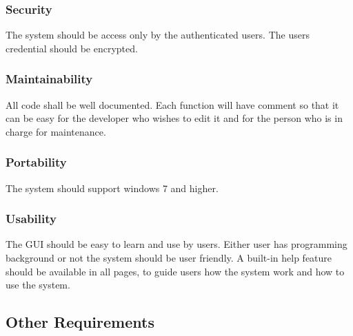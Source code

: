 \documentclass[a4paper,12pt]{article}
\begin{document}
\subsubsection{ Security }
The system should be access only by the authenticated users. The users credential should be encrypted.\subsubsection{Maintainability}
All code shall be well documented. Each function will have comment so that it can be easy for the developer who wishes to edit it and for the person who is in charge for maintenance.
\subsubsection{Portability}
The system should support windows 7 and higher.
\subsubsection{Usability}
 The GUI should be easy to learn and use by users. Either user has programming background or not the system should be user friendly. A built-in help feature should be available in all pages, to guide users how the system work and how to use the system.
\subsection{Other Requirements}

\newpage
\clearpage
{}
\end{document}
